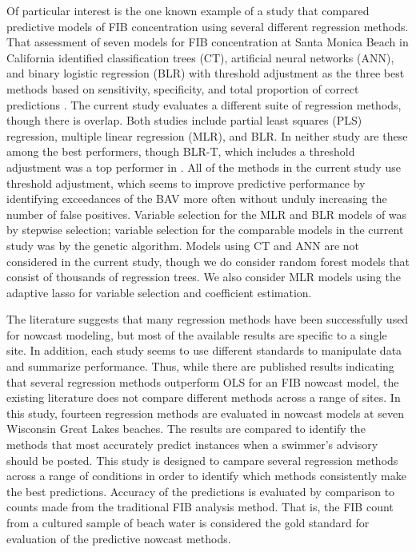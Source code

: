 \documentclass[authoryear,review, 12pt]{elsarticle}
\begin{document}
Of particular interest is the one known example of a study that compared predictive models of FIB concentration using several different regression methods. That assessment of seven models for FIB concentration at Santa Monica Beach in
California identified classification trees (CT), artificial neural networks (ANN),
and binary logistic regression (BLR) with threshold adjustment as the three best methods based on sensitivity, specificity, and total proportion of correct predictions
\citep{Thoe-Gold-Griesbach-Grimmer-Taggart-Boehm-2014}. The current study evaluates a different suite of regression methods, though there is overlap. Both studies include partial least squares (PLS) regression, multiple linear regression (MLR), and BLR. In neither study are these among the best performers, though BLR-T, which includes a threshold adjustment was a top performer in \cite{Thoe-Gold-Griesbach-Grimmer-Taggart-Boehm-2014}. All of the methods in the current study use threshold adjustment, which seems to improve predictive performance by identifying exceedances of the BAV more often without unduly increasing the number of false positives. Variable selection for the MLR and BLR models of \cite{Thoe-Gold-Griesbach-Grimmer-Taggart-Boehm-2014} was by stepwise selection; variable selection for the comparable models in the current study was by the genetic algorithm. Models using CT and ANN are not considered in the current study, though we do consider random forest models that consist of thousands of regression trees. We also consider MLR models using the adaptive lasso for variable selection and coefficient estimation.

The literature suggests that many regression methods have been
successfully used for nowcast modeling, but most of the available results are 
specific to a single site. In addition, each study seems to use different standards to manipulate data and summarize performance. Thus, while there are published results indicating that several regression methods outperform OLS for an FIB nowcast model, the existing literature does not compare different methods across a range of sites. In this
study, fourteen regression methods are evaluated in nowcast models at
seven Wisconsin Great Lakes beaches. The results
are compared to identify the methods that most accurately predict
instances when a swimmer's advisory should be posted. This study is designed to 
campare several regression methods across a range of conditions in order to identify which 
methods consistently make the best predictions. Accuracy of the predictions is evaluated by comparison to counts made from the traditional FIB analysis method. That is, the FIB count from a cultured sample of beach water is considered the gold standard for evaluation of the predictive nowcast methods.
\end{document}
